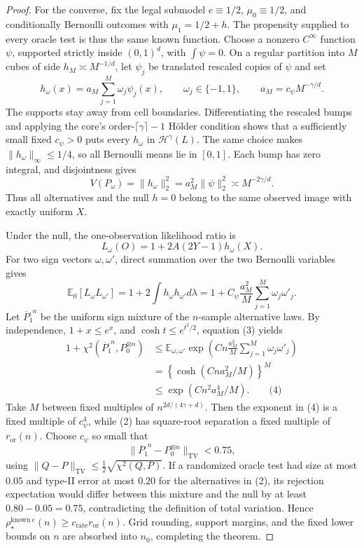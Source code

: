 \documentclass{article}
\begin{document}
\begin{proof}
For the converse, fix the legal submodel \(e\equiv1/2\), \(\mu_0\equiv1/2\), and conditionally Bernoulli outcomes with \(\mu_1=1/2+h\).  The propensity supplied to every oracle test is thus the same known function.  Choose a nonzero \(C^\infty\) function \(\psi\), supported strictly inside \((0,1)^d\), with \(\int\psi=0\).  On a regular partition into \(M\) cubes of side \(h_M\asymp M^{-1/d}\), let \(\psi_j\) be translated rescaled copies of \(\psi\) and set
\[
 h_\omega(x)=a_M\sum_{j=1}^M\omega_j\psi_j(x),
 \qquad \omega_j\in\{-1,1\},\qquad
 a_M=c_\psi M^{-\gamma/d}.
\]
The supports stay away from cell boundaries.  Differentiating the rescaled bumps and applying the core's order-\(\lceil\gamma\rceil-1\) Hölder condition shows that a sufficiently small fixed \(c_\psi>0\) puts every \(h_\omega\) in \(\mathcal H^\gamma(L)\).  The same choice makes \(\|h_\omega\|_\infty\le1/4\), so all Bernoulli means lie in \([0,1]\).  Each bump has zero integral, and disjointness gives
\[
 V(P_\omega)=\|h_\omega\|_2^2
 =a_M^2\|\psi\|_2^2\asymp M^{-2\gamma/d}. \tag{2}
\]
Thus all alternatives and the null \(h=0\) belong to the same observed image with exactly uniform \(X\).

Under the null, the one-observation likelihood ratio is
\[
 L_\omega(O)=1+2A(2Y-1)h_\omega(X).
\]
For two sign vectors \(\omega,\omega'\), direct summation over the two Bernoulli variables gives
\[
 \mathbb E_0[L_\omega L_{\omega'}]
 =1+2\int h_\omega h_{\omega'}d\lambda
 =1+C_\psi\frac{a_M^2}{M}\sum_{j=1}^M\omega_j\omega'_j. \tag{3}
\]
Let \(\overline P_1^{,n}\) be the uniform sign mixture of the \(n\)-sample alternative laws.  By independence, \(1+x\le e^x\), and \(\cosh t\le e^{t^2/2}\), equation (3) yields
\[
\begin{aligned}
 1+\chi^2(\overline P_1^{,n},P_0^{\otimes n})
 &\le \mathbb E_{\omega,\omega'}
   \exp\!\left(Cn\frac{a_M^2}{M}
                    \sum_{j=1}^M\omega_j\omega'_j\right)\\
 &=\left\{\cosh(Cna_M^2/M)\right\}^M\\
 &\le\exp(Cn^2a_M^4/M). \qquad\text{(4)}
\end{aligned}
\]
Take \(M\) between fixed multiples of \(n^{2d/(4\gamma+d)}\).  Then the exponent in (4) is a fixed multiple of \(c_\psi^4\), while (2) has square-root separation a fixed multiple of \(r_{\mathrm{or}}(n)\).  Choose \(c_\psi\) so small that
\[
 \|\overline P_1^{,n}-P_0^{\otimes n}\|_{\mathrm{TV}}<0.75,
\]
using \(\|Q-P\|_{\mathrm{TV}}\le\frac12\sqrt{\chi^2(Q,P)}\).  If a randomized oracle test had size at most \(0.05\) and type-II error at most \(0.20\) for the alternatives in (2), its rejection expectation would differ between this mixture and the null by at least \(0.80-0.05=0.75\), contradicting the definition of total variation.  Hence \(\rho_\star^{\mathrm{known}\ e}(n)\ge c_{\mathrm{rate}}r_{\mathrm{or}}(n)\).  Grid rounding, support margins, and the fixed lower bounds on \(n\) are absorbed into \(n_0\), completing the theorem.
\end{proof}
\end{document}
